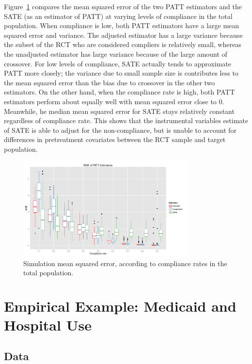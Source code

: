 \documentclass[12pt]{article}
\begin{document}
Figure~\ref{fig:sim_compliance} compares the mean squared error of the two PATT estimators and the SATE (as an estimator of PATT) at varying levels of compliance in the total population.  When compliance is low, both PATT estimators have a large mean squared error and variance.  The adjusted estimator has a large variance because the subset of the RCT who are considered compliers is relatively small, whereas the unadjusted estimator has large variance because of the large amount of crossover.  For low levels of compliance, SATE actually tends to approximate PATT more closely; the variance due to small sample size is contributes less to the mean squared error than the bias due to crossover in the other two estimators.  On the other hand, when the compliance rate is high, both PATT estimators perform about equally well with mean squared error close to $0$.  Meanwhile, he median mean squared error for SATE stays relatively constant regardless of compliance rate.  This shows that the instrumental variables estimate of SATE is able to adjust for the non-compliance, but is unable to account for differences in pretreatment covariates between the RCT sample and target population.

\begin{figure}[htbp]
\begin{center}
\includegraphics[width = 0.8\textwidth]{mse_boxplots_B5}
\caption{Simulation mean squared error, according to compliance rates in the total population.}
\label{fig:sim_compliance}
\end{center}
\end{figure}





\section{Empirical Example: Medicaid and Hospital Use}
\subsection{Data} \label{data}
\end{document}
